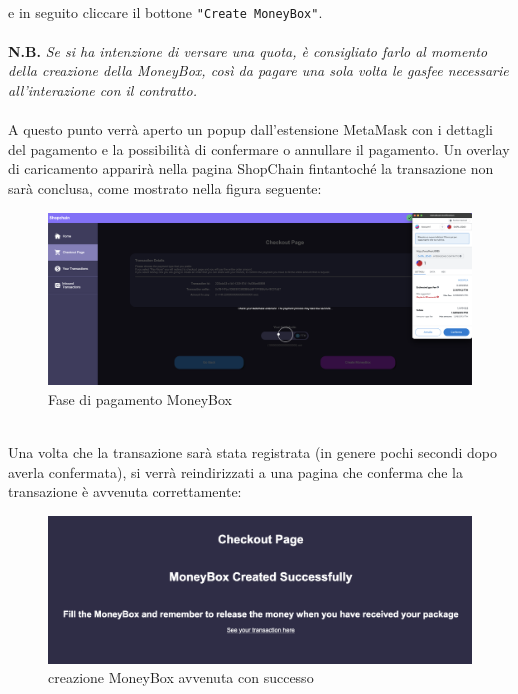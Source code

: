             \textbf{}\\
            e in seguito cliccare il bottone \texttt{"Create MoneyBox"}.\\\\
            \textbf{N.B.} \textit{Se si ha intenzione di versare una quota, è consigliato farlo al momento della creazione della MoneyBox, così da pagare una sola volta le gasfee necessarie all'interazione con il contratto.}\\\\
            A questo punto verrà aperto un popup dall'estensione MetaMask con i dettagli del pagamento e la possibilità di confermare o annullare il pagamento. Un overlay di caricamento apparirà nella pagina ShopChain fintantoché la transazione non sarà conclusa, come mostrato nella figura seguente:
            \begin{figure}[H]
                \centering
                \includegraphics[scale=0.2]{immagini/Checkout/MoneyBoxLayer.png}
                \caption{Fase di pagamento MoneyBox}
            \end{figure}
            \textbf{}\\
            Una volta che la transazione sarà stata registrata (in genere pochi secondi dopo averla confermata), si verrà reindirizzati a una pagina che conferma che la transazione è avvenuta correttamente:
            \begin{figure}[H]
                \centering
                \includegraphics[scale=0.3]{immagini/Checkout/MoneyBoxTransactionSuccess.png}
                \caption{creazione MoneyBox avvenuta con successo}
            \end{figure}
